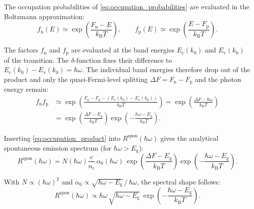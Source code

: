 The occupation probabilities of \cref{eq:occupation_probabilities} are evaluated in
the Boltzmann approximation:
\begin{equation}
	f_{\mathrm{n}}(E)\simeq \exp\left( \frac{F_{\mathrm{n}}-E}{k_{\mathrm{B}}T}\right),\qquad
	f_{\mathrm{p}}(E)\simeq \exp\left( \frac{E-F_{\mathrm{p}}}{k_{\mathrm{B}}T}\right).
\end{equation}

The factors $f_{\mathrm{n}}$ and $f_{\mathrm{p}}$ are evaluated at the band
energies $E_{\mathrm{c}}(k_{0})$ and $E_{\mathrm{v}}(k_{0})$ of the transition. The
$\delta$-function fixes their difference to $E_{\mathrm{c}}(k_{0})-E_{\mathrm{v}}
(k_{0})=\hbar\omega$. The individual band energies therefore drop out of the
product and only the quasi-Fermi-level splitting
$\Delta F=F_{\mathrm{n}}-F_{\mathrm{p}}$ and the photon energy remain:
\begin{equation}
	\begin{aligned}
		f_{\mathrm{n}}f_{\mathrm{p}} & \simeq \exp \left( \frac{F_{\mathrm{n}}-F_{\mathrm{p}}-\left(E_{\mathrm{c}}(k_{0})-E_{\mathrm{v}}(k_{0})\right)}{k_{\mathrm{B}}T}\right)=\exp \left( \frac{\Delta F -\hbar \omega}{k_{\mathrm{B}}T}\right) \\
		                             & =\exp\left( \frac{\Delta F-E_{\mathrm{g}}}{k_{\mathrm{B}}T}\right) \exp\left( -\frac{\hbar \omega-E_{\mathrm{g}}}{k_{\mathrm{B}}T}\right).
	\end{aligned}
	\label{eq:occupation_product}
\end{equation}

Inserting \cref{eq:occupation_product} into $R^{\mathrm{spon}}(\hbar\omega)$ gives the
analytical spontaneous emission spectrum (for $\hbar\omega>E_{\mathrm{g}}$):
\begin{equation}
	R^{\mathrm{spon}}(\hbar \omega)= N(\hbar\omega)\frac{c}{n_{\mathrm{r}}}\,\alpha
	_{0}(\hbar \omega)\,\exp\left( \frac{\Delta F-E_{\mathrm{g}}}{k_{\mathrm{B}}T}\right
	) \exp\left( -\frac{\hbar \omega-E_{\mathrm{g}}}{k_{\mathrm{B}}T}\right).
\end{equation}

With $N\propto(\hbar\omega)^{2}$ and $\alpha_{0}\propto\sqrt{\hbar\omega-E_{\mathrm{g}}}
\,/\,\hbar\omega$, the spectral shape follows:
\begin{equation}
	R^{\mathrm{spon}}(\hbar \omega)\propto \hbar\omega\,\sqrt{\hbar\omega-E_{\mathrm{g}}}
	\,\exp\left( -\frac{\hbar \omega-E_{\mathrm{g}}}{k_{\mathrm{B}}T}\right).
\end{equation}

